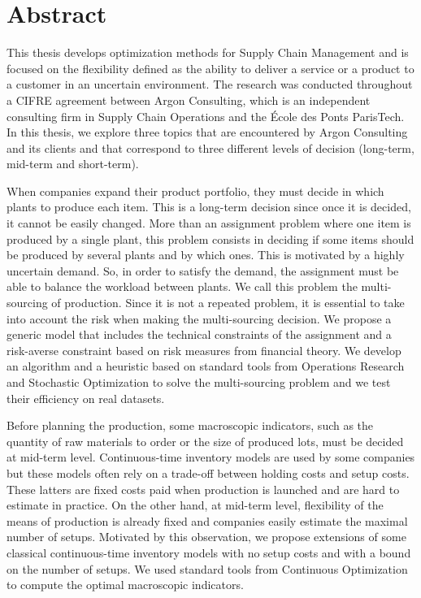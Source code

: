 \chapter*{Abstract} %
\label{cha:abstract}



This thesis develops optimization methods for Supply Chain Management and is focused on the flexibility defined as the ability to deliver a service or a product to a customer in an uncertain environment.
The research was conducted throughout a CIFRE agreement between Argon Consulting, which is an independent consulting firm in Supply Chain Operations and the \'Ecole des Ponts ParisTech.
In this thesis, we explore three topics that are encountered by Argon Consulting and its clients and that correspond to three different levels of decision (long-term, mid-term and short-term).


When companies expand their product portfolio, they must decide in which plants to produce each item.
This is a long-term decision since once it is decided, it cannot be easily changed.
More than an assignment problem where one item is produced by a single plant, this problem  consists in deciding if some items should be produced by several plants and by which ones.
This is motivated by a highly uncertain demand.
So, in order to satisfy the demand, the assignment must be able to balance the workload between plants.
We call this problem the multi-sourcing of production.
Since it is not a repeated problem, it is essential to take into account the risk when making the multi-sourcing decision.
We propose a generic model that includes the technical constraints of the assignment and a risk-averse constraint based on risk measures from financial theory.
We develop an algorithm and a heuristic based on standard tools from Operations Research and Stochastic Optimization to solve the multi-sourcing problem and we test their efficiency on real datasets.


Before planning the production, some macroscopic indicators, such as the quantity of raw materials to order or the size of produced lots, must be decided at mid-term level.
Continuous-time inventory models are used by some companies but these models often rely on a trade-off between holding costs and setup costs.
These latters are fixed costs paid when production is launched and are hard to estimate in practice.
On the other hand, at mid-term level, flexibility of the means of production is already fixed and companies easily estimate the maximal number of setups.
Motivated by this observation, we propose extensions of some classical continuous-time inventory models with no setup costs and with a bound on the number of setups.
We used standard tools from Continuous Optimization to compute the optimal macroscopic indicators.


